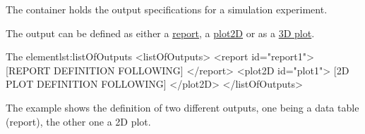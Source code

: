 \label{sec:listOfOutputs}

The  container holds the output specifications for a simulation experiment. 
%
%

The output can be defined as either a \hyperref[class:report]{report}, a \hyperref[class:2dPlot]{plot2D} or  as a \hyperref[class:plot3D]{3D plot}. 

%
\begin{myXmlLst}{The  element}{lst:listOfOutputs}
<listOfOutputs>
 <report id="report1">
  [REPORT DEFINITION FOLLOWING]
 </report>
 <plot2D id="plot1">
  [2D PLOT DEFINITION FOLLOWING] 
 </plot2D>
</listOfOutputs>
\end{myXmlLst}
%
The example shows the definition of two different outputs, one being a data table (report), the other one a 2D plot.

